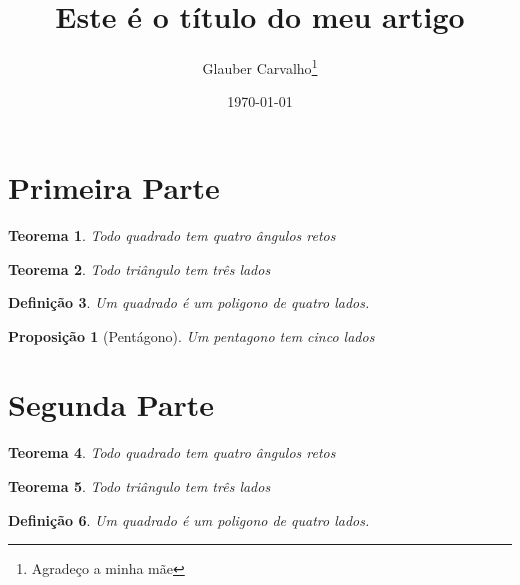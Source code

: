 \documentclass[12pt, a4paper]{article}	%
\title{Este é o título do meu artigo}	%
\author{Glauber Carvalho\thanks{Agradeço a minha mãe}}	%
\date{\today}	%
\newtheorem{teorema}{Teorema}[section]	%
\newtheorem{definicao}[teorema]{Definição} %
\newtheorem{proposicao}{Proposição}[section] %
\begin{document}
	\section{Primeira Parte}
	\begin{teorema}
		Todo quadrado tem quatro ângulos retos
	\end{teorema}
	\begin{teorema}
		Todo triângulo tem três lados
	\end{teorema}
	\begin{definicao}
		Um quadrado é um poligono de quatro lados.
	\end{definicao}
	\begin{proposicao}[Pentágono] %
		Um pentagono tem cinco lados
	\end{proposicao}


	\section{Segunda Parte}
	\begin{teorema}
		Todo quadrado tem quatro ângulos retos
	\end{teorema}
	\begin{teorema}
		Todo triângulo tem três lados
	\end{teorema}
	\begin{definicao}
	Um quadrado é um poligono de quatro lados.
	\end{definicao}
	
		
\end{document}
